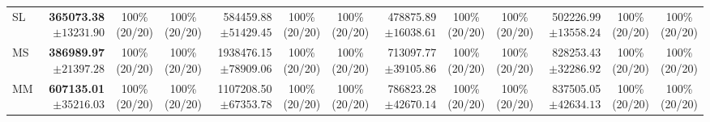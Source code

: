 \documentclass[10pt]{article}
\begin{document}
\begin{table}[!htbp]
\begin{tabular}{@{}l*{4}{rcc}@{}}
SL & \shortstack[r]{\textbf{365073.38}\\$\pm 13231.90$} & \shortstack[c]{100\%\\(20/20)} & \shortstack[c]{100\%\\(20/20)} & \shortstack[r]{584459.88\\$\pm 51429.45$} & \shortstack[c]{100\%\\(20/20)} & \shortstack[c]{100\%\\(20/20)} & \shortstack[r]{478875.89\\$\pm 16038.61$} & \shortstack[c]{100\%\\(20/20)} & \shortstack[c]{100\%\\(20/20)} & \shortstack[r]{502226.99\\$\pm 13558.24$} & \shortstack[c]{100\%\\(20/20)} & \shortstack[c]{100\%\\(20/20)} \\
MS & \shortstack[r]{\textbf{386989.97}\\$\pm 21397.28$} & \shortstack[c]{100\%\\(20/20)} & \shortstack[c]{100\%\\(20/20)} & \shortstack[r]{1938476.15\\$\pm 78909.06$} & \shortstack[c]{100\%\\(20/20)} & \shortstack[c]{100\%\\(20/20)} & \shortstack[r]{713097.77\\$\pm 39105.86$} & \shortstack[c]{100\%\\(20/20)} & \shortstack[c]{100\%\\(20/20)} & \shortstack[r]{828253.43\\$\pm 32286.92$} & \shortstack[c]{100\%\\(20/20)} & \shortstack[c]{100\%\\(20/20)} \\
MM & \shortstack[r]{\textbf{607135.01}\\$\pm 35216.03$} & \shortstack[c]{100\%\\(20/20)} & \shortstack[c]{100\%\\(20/20)} & \shortstack[r]{1107208.50\\$\pm 67353.78$} & \shortstack[c]{100\%\\(20/20)} & \shortstack[c]{100\%\\(20/20)} & \shortstack[r]{786823.28\\$\pm 42670.14$} & \shortstack[c]{100\%\\(20/20)} & \shortstack[c]{100\%\\(20/20)} & \shortstack[r]{837505.05\\$\pm 42634.13$} & \shortstack[c]{100\%\\(20/20)} & \shortstack[c]{100\%\\(20/20)} \\

\end{tabular}
\end{table}
\end{document}
